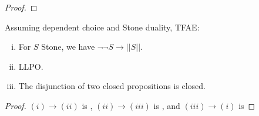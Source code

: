 \begin{proof}
\end{proof}

\begin{corollary}
Assuming dependent choice and Stone duality, TFAE:
\begin{enumerate}[(i)]
  \item For $S$ Stone, we have $\neg \neg S \to ||S||$. 
  \item LLPO.
  \item The disjunction of two closed propositions is closed. 
\end{enumerate}
\end{corollary}
\begin{proof}
  $(i) \to (ii)$ is , $(ii) \to (iii)$ is , 
  and $(iii) \to (i)$ is 
\end{proof}
